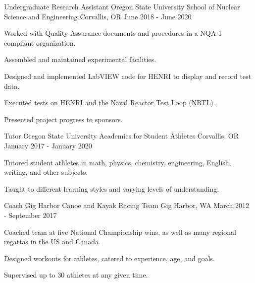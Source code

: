 \begin{cventries}
  \cventry
    {Undergraduate Research Assistant} %
    {Oregon State University School of Nuclear Science and Engineering} %
    {Corvallis, OR} %
    {June 2018 - June 2020} %
    {
      \begin{cvitems} %
        \item {Worked with Quality Assurance documents and procedures in a NQA-1 compliant organization.}
        \item{Assembled and maintained experimental facilities.}
        \item{Designed and implemented LabVIEW code for HENRI to display and record test data.}
        \item{Executed tests on HENRI and the Naval Reactor Test Loop (NRTL).}
        \item{Presented project progress to sponsors.}
      \end{cvitems}
    }

  \cventry
    {Tutor} %
    {Oregon State University Academics for Student Athletes} %
    {Corvallis, OR} %
    {January 2017 - January 2020} %
    {
      \begin{cvitems} %
        \item {Tutored student athletes in math, physics, chemistry, engineering, English, writing, and other subjects.}
        \item{Taught to different learning styles and varying levels of understanding.}
      \end{cvitems}
    }

  \cventry
    {Coach} %
    {Gig Harbor Canoe and Kayak Racing Team} %
    {Gig Harbor, WA} %
    {March 2012 - September 2017} %
    {
      \begin{cvitems} %
        \item {Coached team at five National Championship wins, as well as many regional regattas in the US and Canada.}
		\item {Designed workouts for athletes, catered to experience, age, and goals.}
		\item{Supervised up to 30 athletes at any given time.}
      \end{cvitems}
    }

  
\end{cventries}
